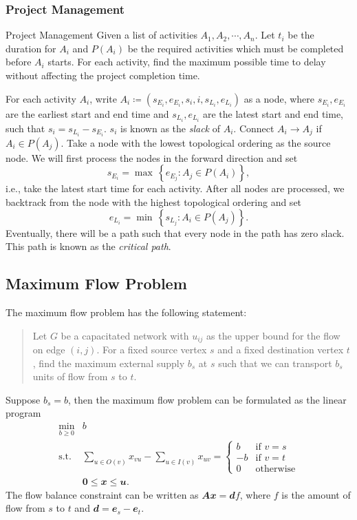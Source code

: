 \documentclass[math, code]{amznotes}
\theoremstyle{remark}
\begin{document}
\subsubsection{Project Management}
\begin{genbox}{Project Management}
    Given a list of activities $A_1, A_2, \cdots, A_n$. Let $t_i$ be the duration for $A_i$ and $P(A_i)$ be the required activities which must be completed before $A_i$ starts. For each activity, find the maximum possible time to delay without affecting the project completion time.
\end{genbox}
For each activity $A_i$, write $A_i \coloneqq \left(s_{E_i}, e_{E_i}, s_i, i, s_{L_i}, e_{L_i}\right)$ as a node, where $s_{E_i}, e_{E_i}$ are the earliest start and end time and $s_{L_i}, e_{L_i}$ are the latest start and end time, such that $s_i = s_{L_i} - s_{E_i}$. $s_i$ is known as the \textit{slack} of $A_i$. Connect $A_i \to A_j$ if $A_i \in P(A_j)$. Take a node with the lowest topological ordering as the source node. We will first process the nodes in the forward direction and set 
\begin{equation*}
    s_{E_i} = \max\,\left\{e_{E_j} \colon A_j \in P(A_i)\right\},
\end{equation*}
i.e., take the latest start time for each activity. After all nodes are processed, we backtrack from the node with the highest topological ordering and set 
\begin{equation*}
    e_{L_i} = \min\,\left\{s_{L_j} \colon A_i \in P(A_j)\right\}.
\end{equation*}
Eventually, there will be a path such that every node in the path has zero slack. This path is known as the \textit{critical path}.
\subsection{Maximum Flow Problem}
The maximum flow problem has the following statement:
\begin{quote}
    Let $G$ be a capacitated network with $u_{ij}$ as the upper bound for the flow on edge $(i, j)$. For a fixed source vertex $s$ and a fixed destination vertex $t$, find the maximum external supply $b_s$ at $s$ such that we can transport $b_s$ units of flow from $s$ to $t$.
\end{quote}
Suppose $b_s = b$, then the maximum flow problem can be formulated as the linear program 
\begin{align*}
    \min_{b \geq 0} & b \\
    \textrm{s.t. } & \sum_{u \in O(v)}x_{vu} - \sum_{u \in I(v)}x_{uv} = \begin{cases}
        b & \textrm{if } v = s \\
        -b & \textrm{if } v = t \\
        0 & \textrm{otherwise}
    \end{cases} \\
    & \mathbf{0} \leq \mathbfit{x} \leq \mathbfit{u}. 
\end{align*}
The flow balance constraint can be written as $\mathbfit{Ax = d}f$, where $f$ is the amount of flow from $s$ to $t$ and $\mathbfit{d} = \mathbfit{e}_s - \mathbfit{e}_t$.
\end{document}
